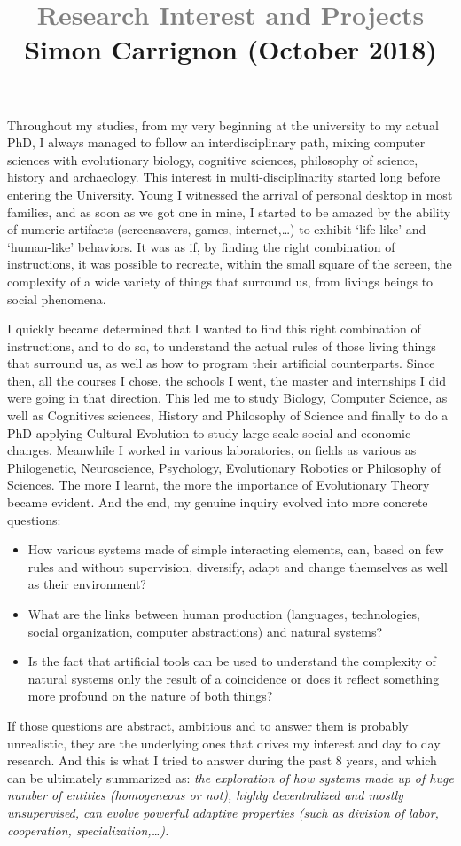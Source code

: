 \documentclass[10pt]{article}
\title{\textcolor{grey}{\Large Research Interest and Projects}\\
\vspace{-.25cm}
{ \normalsize Simon Carrignon (October 2018)}}
\author{}
\date{}
\begin{document}
\maketitle

\vspace{-.5cm}

Throughout my studies, from my very beginning at the university to my actual PhD, I always managed to follow an interdisciplinary path, mixing computer sciences with evolutionary biology, cognitive sciences, philosophy of science, history and archaeology. This interest in multi-disciplinarity started long before entering the University. Young I witnessed the arrival of personal desktop in most families, and as soon as we got one in mine, I started to be amazed by the ability of numeric artifacts (screensavers, games, internet,\ldots) to exhibit ‘life-like’ and ‘human-like’ behaviors. 
It was as if, by finding the right combination of instructions, it was possible to recreate, within the small square of the screen, the complexity of a wide variety of things that surround us, from livings beings to social phenomena.

I quickly became determined that I wanted to find this right combination of instructions, and to do so, to understand the actual rules of those living things that surround us, as well as how to program their artificial counterparts.  Since then, all the courses I chose, the schools I went, the master and internships I did were going in that direction. This led me to study Biology, Computer Science, as well as Cognitives sciences, History and Philosophy of Science and finally to do a PhD applying Cultural Evolution to study large scale social and economic changes. Meanwhile I worked  in various laboratories, on fields as various as Philogenetic, Neuroscience, Psychology, Evolutionary Robotics or Philosophy of Sciences. The more I learnt, the more the importance of Evolutionary Theory became evident. And the end, my genuine inquiry evolved into more concrete questions: 
\begin{itemize}
    \item How various systems made of simple interacting elements, can, based on few rules and without supervision, diversify, adapt and change themselves as well as their environment?
    \item What are the links between human production (languages, technologies, social organization, computer abstractions) and natural systems? 
    \item Is the fact that artificial tools can be used to understand the complexity of natural systems only the result of a coincidence or does it reflect something more profound on the nature of both things?
\end{itemize}
If those questions are abstract, ambitious and to answer them is probably unrealistic, they are the underlying ones that drives my interest and day to day research. And this is what I tried to answer during the past 8 years, and which can be ultimately  summarized as: \emph{the exploration of how systems made up of huge number of entities (homogeneous or not), highly decentralized and mostly unsupervised, can evolve powerful adaptive properties (such as division of labor, cooperation, specialization,\ldots).}
\end{document}
